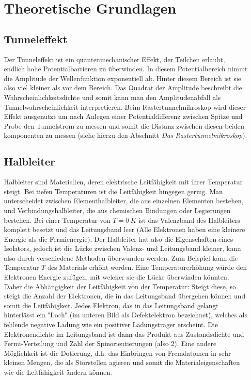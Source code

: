 \section{Theoretische Grundlagen}

\subsection{Tunneleffekt}

Der Tunneleffekt ist ein quantenmechanischer Effekt, der Teilchen erlaubt, endlich hohe Potentialbarrieren zu überwinden. In diesem Potentialbereich nimmt die Amplitude der Wellenfunktion exponentiell ab. Hinter diesem Bereich ist sie also viel kleiner als vor dem Bereich. Das Quadrat der Amplitude beschreibt die Wahrscheinlichkeitsdichte und somit kann man den Amplitudenabfall als Tunnelwahrscheinlichkeit interpretieren.
Beim Rastertunnelmikroskop wird dieser Effekt ausgenutzt um nach Anlegen einer Potentialdifferenz zwischen Spitze und Probe den Tunnelstrom zu messen und somit die Distanz zwischen diesen beiden komponenten zu messen (siehe hierzu den Abschnitt \emph{Das Rastertunnelmikroskop}).

\subsection{Halbleiter}


Halbleiter sind Materialien, deren elektrische Leitfähigkeit mit ihrer Temperatur steigt. Bei tiefen Temperaturen ist die Leitfähigkeit hingegen gering. Man unterscheidet zwischen Elementhalbleiter, die aus einzelnen Elementen bestehen, und Verbindungshalbleiter, die aus chemischen Bindungen oder Legierungen bestehen. Bei einer Temperatur von $T=0 \ K$ ist das Valenzband des Halbleiters komplett besetzt und das Leitungsband leer (Alle Elektronen haben eine kleinere Energie als die Fermienergie). Der Halbleiter hat also die Eigenschaften eines Isolators, jedoch ist die Lücke zwischen Valenz- und Leitungsband kleiner, kann also durch verschiedene Methoden überwunden werden. Zum Beispiel kann die Temperatur $T$ des Materials erhöht werden. Eine Temperaturerhöhung würde den Elektronen Energie zufügen, mit welcher sie die Lücke überwinden könnten. Daher die Abhängigkeit der Leitfähigkeit von der Temperatur: Steigt diese, so steigt die Anzahl der Elektronen, die in das Leitungsband übergehen können und somit die Leitfähigkeit. Jedes Elektron, das in das Leitungsband gelangt hinterlässt ein "Loch" (im unteren Bild als Defektelektron bezeichnet), welches als fehlende negative Ladung wie ein positiver Ladungsträger erscheint. Die Elektronendichte im Leitungsband ist dann das Produkt aus Zustandsdichte und Fermi-Verteilung und Zahl der Spinorientierungen (also 2). Eine andere Möglichkeit ist die Dotierung, d.h. das Einbringen von Fremdatomen in sehr kleinen Mengen, die als Störstellen agieren und somit die Materialeigenschaften wie die Leitfähigkeit ändern können.

